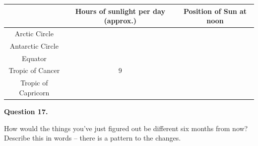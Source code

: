 \documentclass[11pt]{article}
\begin{document}
\begin{center}
\begin{tabular}{|c| c |c|}
\hline
 & Hours of sunlight per day (approx.) & Position of Sun at noon \\
\hline
Arctic Circle & & \\
\hline
Antarctic Circle & &\\
\hline
Equator & & \\
\hline
Tropic of Cancer & 9 & \\
\hline
Tropic of Capricorn & & \\
\hline
\end{tabular}
\normalsize
\end{center}



\textbf{Question 17.}

How would the things you've just figured out be different six months from now? Describe this in words -- there is a pattern to the changes.
\end{document}
